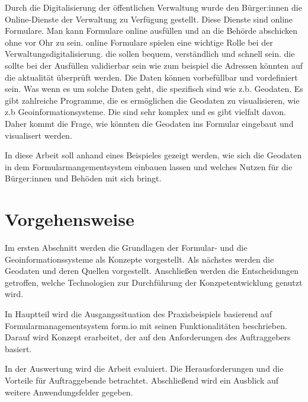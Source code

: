 Durch die Digitalisierung der öffentlichen Verwaltung wurde den Bürger:innen die Online-Dienste der Verwaltung zu Verfügung gestellt. Diese Dienste sind online Formulare. Man kann Formulare online ausfüllen und an die Behörde abschicken ohne vor Ohr zu sein. 
online Formulare spielen eine wichtige Rolle bei der Verwaltungsdigitalisierung. die sollen bequem, verständlich und schnell sein. die sollte bei der Ausfüllen validierbar sein wie zum beispiel die Adressen könnten auf die aktualität überprüft werden. Die Daten können vorbefüllbar und vordefiniert sein. Was wenn es um solche Daten geht, die spezifisch sind wie z.b. Geodaten. Es gibt zahlreiche Programme, die es ermöglichen die Geodaten zu visualisieren, wie z.b Geoinformationsysteme. Die sind sehr komplex und es gibt vielfalt davon. Daher kommt die Frage, wie könnten die Geodaten ins Formular eingebaut und visualisert werden.

In diese Arbeit soll anhand eines Beispieles gezeigt werden, wie sich die Geodaten in dem Formularmangementsystem einbauen lassen und welches Nutzen für die Bürger:innen und Behöden mit sich bringt.



 

\section{Vorgehensweise}
Im ersten Abschnitt werden die Grundlagen der Formular- und die Geoinformationssysteme als Konzepte vorgestellt. Als nächstes werden die Geodaten und deren Quellen vorgestellt. Anschließen werden die Entscheidungen getroffen, welche Technologien zur Durchführung der Konzpetentwicklung genutzt wird.

In Hauptteil wird die Ausgangssituation des Praxisbeispiels basierend auf Formularmanagementsystem form.io mit seinen Funktionalitäten beschrieben. 
Darauf wird Konzept erarbeitet, der auf den Anforderungen des Auftraggebers basiert.

In der Auswertung wird die Arbeit evaluiert. Die Herausforderungen und die Vorteile für Auftraggebende betrachtet. Abschließend wird ein Ausblick auf weitere Anwendungsfelder gegeben.
